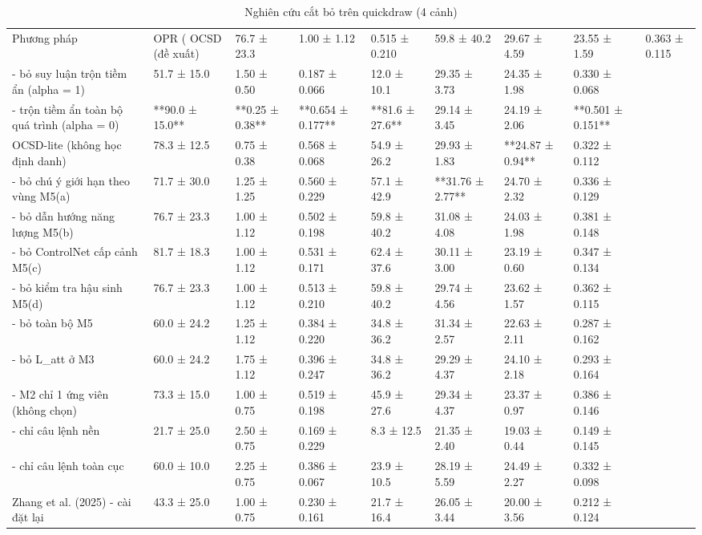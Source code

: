 \begin{table}
\caption{Nghiên cứu cắt bỏ trên quickdraw (4 cảnh)}
\begin{tabular}{llllllll}
\toprule
Phương pháp & OPR (%
\midrule
OCSD (đề xuất) & 76.7 ± 23.3 & 1.00 ± 1.12 & 0.515 ± 0.210 & 59.8 ± 40.2 & 29.67 ± 4.59 & 23.55 ± 1.59 & 0.363 ± 0.115 \\
- bỏ suy luận trộn tiềm ẩn (alpha = 1) & 51.7 ± 15.0 & 1.50 ± 0.50 & 0.187 ± 0.066 & 12.0 ± 10.1 & 29.35 ± 3.73 & 24.35 ± 1.98 & 0.330 ± 0.068 \\
- trộn tiềm ẩn toàn bộ quá trình (alpha = 0) & **90.0 ± 15.0** & **0.25 ± 0.38** & **0.654 ± 0.177** & **81.6 ± 27.6** & 29.14 ± 3.45 & 24.19 ± 2.06 & **0.501 ± 0.151** \\
OCSD-lite (không học định danh) & 78.3 ± 12.5 & 0.75 ± 0.38 & 0.568 ± 0.068 & 54.9 ± 26.2 & 29.93 ± 1.83 & **24.87 ± 0.94** & 0.322 ± 0.112 \\
- bỏ chú ý giới hạn theo vùng M5(a) & 71.7 ± 30.0 & 1.25 ± 1.25 & 0.560 ± 0.229 & 57.1 ± 42.9 & **31.76 ± 2.77** & 24.70 ± 2.32 & 0.336 ± 0.129 \\
- bỏ dẫn hướng năng lượng M5(b) & 76.7 ± 23.3 & 1.00 ± 1.12 & 0.502 ± 0.198 & 59.8 ± 40.2 & 31.08 ± 4.08 & 24.03 ± 1.98 & 0.381 ± 0.148 \\
- bỏ ControlNet cấp cảnh M5(c) & 81.7 ± 18.3 & 1.00 ± 1.12 & 0.531 ± 0.171 & 62.4 ± 37.6 & 30.11 ± 3.00 & 23.19 ± 0.60 & 0.347 ± 0.134 \\
- bỏ kiểm tra hậu sinh M5(d) & 76.7 ± 23.3 & 1.00 ± 1.12 & 0.513 ± 0.210 & 59.8 ± 40.2 & 29.74 ± 4.56 & 23.62 ± 1.57 & 0.362 ± 0.115 \\
- bỏ toàn bộ M5 & 60.0 ± 24.2 & 1.25 ± 1.12 & 0.384 ± 0.220 & 34.8 ± 36.2 & 31.34 ± 2.57 & 22.63 ± 2.11 & 0.287 ± 0.162 \\
- bỏ L_att ở M3 & 60.0 ± 24.2 & 1.75 ± 1.12 & 0.396 ± 0.247 & 34.8 ± 36.2 & 29.29 ± 4.37 & 24.10 ± 2.18 & 0.293 ± 0.164 \\
- M2 chỉ 1 ứng viên (không chọn) & 73.3 ± 15.0 & 1.00 ± 0.75 & 0.519 ± 0.198 & 45.9 ± 27.6 & 29.34 ± 4.37 & 23.37 ± 0.97 & 0.386 ± 0.146 \\
- chỉ câu lệnh nền & 21.7 ± 25.0 & 2.50 ± 0.75 & 0.169 ± 0.229 & 8.3 ± 12.5 & 21.35 ± 2.40 & 19.03 ± 0.44 & 0.149 ± 0.145 \\
- chỉ câu lệnh toàn cục & 60.0 ± 10.0 & 2.25 ± 0.75 & 0.386 ± 0.067 & 23.9 ± 10.5 & 28.19 ± 5.59 & 24.49 ± 2.27 & 0.332 ± 0.098 \\
Zhang et al. (2025) - cài đặt lại & 43.3 ± 25.0 & 1.00 ± 0.75 & 0.230 ± 0.161 & 21.7 ± 16.4 & 26.05 ± 3.44 & 20.00 ± 3.56 & 0.212 ± 0.124 \\
\bottomrule
\end{tabular}
\end{table}
